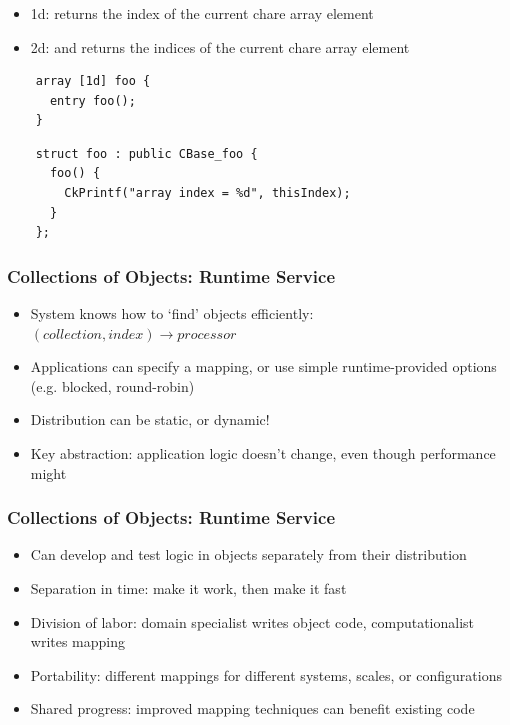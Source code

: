 \begin{frame}[fragile]
  \frametitle{}
  \begin{itemize}
  \item 1d:  returns the index of the current chare array element
  \item 2d:  and  returns the indices of
    the current chare array element
  \end{itemize}
  \begin{lstlisting}
    array [1d] foo {
      entry foo();
    }
  \end{lstlisting}

  \begin{lstlisting}
    struct foo : public CBase_foo {
      foo() {
        CkPrintf("array index = %d", thisIndex);
      }
    };
  \end{lstlisting}

\end{frame}

\begin{frame}[fragile]
  \frametitle{Collections of Objects: Runtime Service}
  \begin{itemize}
    \item System knows how to `find' objects efficiently: $(collection, index) \to processor$
    \item Applications can specify a mapping, or use simple
      runtime-provided options (e.g. blocked, round-robin)
    \item Distribution can be static, or dynamic!
    \item Key abstraction: application logic doesn't change, even
      though performance might
  \end{itemize}
\end{frame}

\begin{frame}[fragile]
  \frametitle{Collections of Objects: Runtime Service}
  \begin{itemize}
    \item Can develop and test logic in objects separately from their distribution
    \item Separation in time: make it work, then make it fast
    \item Division of labor: domain specialist writes object code, computationalist writes mapping
    \item Portability: different mappings for different systems, scales, or configurations
    \item Shared progress: improved mapping techniques can benefit existing code
  \end{itemize}
\end{frame}

